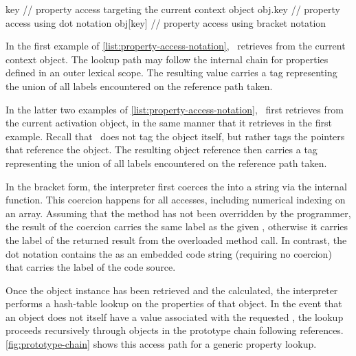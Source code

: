 \begin{jscode}
key      // property access targeting the current context object
obj.key  // property access using dot notation
obj[key] // property access using bracket notation
\end{jscode}

In the first example of \autoref{list:property-access-notation}, \FlowCore\ retrieves  from the current context object.
The lookup path may follow the internal  chain for properties defined in an outer lexical scope.
The resulting value  carries a tag representing the union of all labels encountered on the reference path taken.

In the latter two examples of \autoref{list:property-access-notation}, \FlowCore\ first retrieves  from the current activation object, in the same manner that it retrieves  in the first example.
Recall that \FlowCore\ does not tag the object itself, but rather tags the pointers that reference the object.
The resulting object reference  then carries a tag representing the union of all labels encountered on the reference path taken.

In the bracket form, the interpreter first coerces the  into a string via the internal  function.
This coercion happens for all accesses, including numerical indexing on an array.
Assuming that the  method has not been overridden by the programmer, the result of the coercion carries the same label as the given , otherwise it carries the label of the returned result from the overloaded method call.
In contrast, the dot notation contains the  as an embedded code string (requiring no coercion) that carries the label of the code source.

Once the object instance  has been retrieved and the  calculated, the interpreter performs a hash-table lookup on the properties of that object.
In the event that an object does not itself have a value associated with the requested , the lookup proceeds recursively through objects in the prototype chain following  references.
\autoref{fig:prototype-chain} shows this access path for a generic property lookup.


